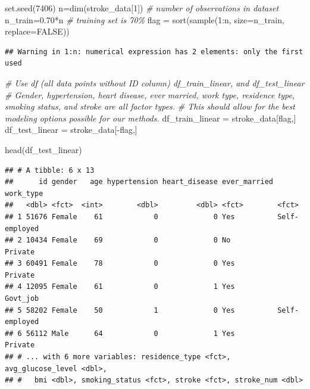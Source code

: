 \documentclass[
]{article}
\newenvironment{Shaded}{\begin{snugshade}}{\end{snugshade}}
\newcommand{\AttributeTok}[1]{\textcolor[rgb]{0.77,0.63,0.00}{#1}}
\newcommand{\CommentTok}[1]{\textcolor[rgb]{0.56,0.35,0.01}{\textit{#1}}}
\newcommand{\ConstantTok}[1]{\textcolor[rgb]{0.00,0.00,0.00}{#1}}
\newcommand{\DecValTok}[1]{\textcolor[rgb]{0.00,0.00,0.81}{#1}}
\newcommand{\FloatTok}[1]{\textcolor[rgb]{0.00,0.00,0.81}{#1}}
\newcommand{\FunctionTok}[1]{\textcolor[rgb]{0.00,0.00,0.00}{#1}}
\newcommand{\NormalTok}[1]{#1}
\newcommand{\OtherTok}[1]{\textcolor[rgb]{0.56,0.35,0.01}{#1}}
\newcommand{\SpecialCharTok}[1]{\textcolor[rgb]{0.00,0.00,0.00}{#1}}
\renewcommand{\=}[1]{\stackrel{#1}{=}}
\theoremstyle{definition}
\theoremstyle{remark}
\begin{document}
\begin{Shaded}
\begin{Highlighting}[]
\FunctionTok{set.seed}\NormalTok{(}\DecValTok{7406}\NormalTok{)}
\NormalTok{n}\OtherTok{=}\FunctionTok{dim}\NormalTok{(stroke\_data[}\DecValTok{1}\NormalTok{])  }\CommentTok{\# number of observations in dataset}
\NormalTok{n\_train}\OtherTok{=}\FloatTok{0.70}\SpecialCharTok{*}\NormalTok{n  }\CommentTok{\# training set is 70\%}
\NormalTok{flag }\OtherTok{=} \FunctionTok{sort}\NormalTok{(}\FunctionTok{sample}\NormalTok{(}\DecValTok{1}\SpecialCharTok{:}\NormalTok{n, }\AttributeTok{size=}\NormalTok{n\_train, }\AttributeTok{replace=}\ConstantTok{FALSE}\NormalTok{))}
\end{Highlighting}
\end{Shaded}

\begin{verbatim}
## Warning in 1:n: numerical expression has 2 elements: only the first used
\end{verbatim}

\begin{Shaded}
\begin{Highlighting}[]
\CommentTok{\# Use df (all data points without ID column) df\_train\_linear, and df\_test\_linear}
\CommentTok{\# Gender, hypertension, heart disease, ever married, work type, residence type, smoking status, and stroke are all factor types.}
\CommentTok{\# This should allow for the best modeling options possible for our methods.}
\NormalTok{df\_train\_linear }\OtherTok{=}\NormalTok{ stroke\_data[flag,]}
\NormalTok{df\_test\_linear }\OtherTok{=}\NormalTok{ stroke\_data[}\SpecialCharTok{{-}}\NormalTok{flag,]}
\end{Highlighting}
\end{Shaded}

\begin{Shaded}
\begin{Highlighting}[]
\FunctionTok{head}\NormalTok{(df\_test\_linear)}
\end{Highlighting}
\end{Shaded}

\begin{verbatim}
## # A tibble: 6 x 13
##      id gender   age hypertension heart_disease ever_married work_type    
##   <dbl> <fct>  <int>        <dbl>         <dbl> <fct>        <fct>        
## 1 51676 Female    61            0             0 Yes          Self-employed
## 2 10434 Female    69            0             0 No           Private      
## 3 60491 Female    78            0             0 Yes          Private      
## 4 12095 Female    61            0             1 Yes          Govt_job     
## 5 58202 Female    50            1             0 Yes          Self-employed
## 6 56112 Male      64            0             1 Yes          Private      
## # ... with 6 more variables: residence_type <fct>, avg_glucose_level <dbl>,
## #   bmi <dbl>, smoking_status <fct>, stroke <fct>, stroke_num <dbl>
\end{verbatim}
\end{document}
